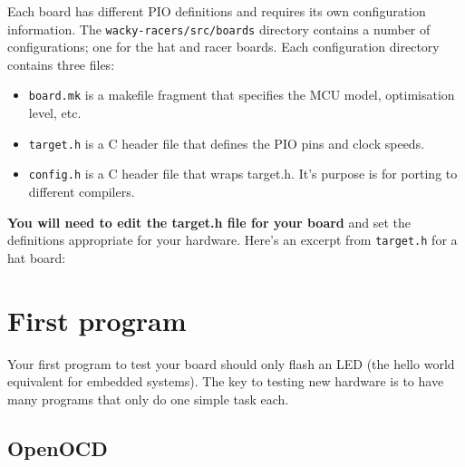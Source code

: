 Each board has different PIO definitions and requires its own
configuration information. The \texttt{wacky-racers/src/boards}
directory contains a number of configurations; one for the hat and racer
boards. Each configuration directory contains three files:

\begin{itemize}
\item
  \texttt{board.mk} is a makefile fragment that specifies the MCU model,
  optimisation level, etc.
\item
  \texttt{target.h} is a C header file that defines the PIO pins and
  clock speeds.
\item
  \texttt{config.h} is a C header file that wraps target.h. It's purpose
  is for porting to different compilers.
\end{itemize}

\textbf{You will need to edit the target.h file for your board} and set
the definitions appropriate for your hardware. Here's an excerpt from
\texttt{target.h} for a hat board:

\begin{Shaded}
\begin{Highlighting}[]



\end{Highlighting}
\end{Shaded}

\section{First program}
\label{first-program}

Your first program to test your board should only flash an LED (the
hello world equivalent for embedded systems). The key to testing new
hardware is to have many programs that only do one simple task each.

\subsection{OpenOCD}
\label{openocd}

